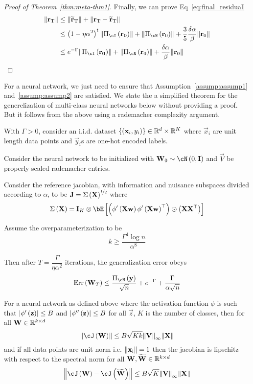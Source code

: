 \documentclass[a4paper]{article}
\begin{document}
\begin{proof}[Proof of Theorem~\ref{thm:meta-thm1}]
  Finally, we can prove Eq~\eqref{eq:final_residual}
  \begin{align*}
    \norm{\vec{r}_T}&\le \norm{\widetilde{\vec{r}}_T} + \norm{\vec{r}_T
                      - \widetilde{\vec{r}}_T}\\
                    &\le \br{1 -
        \eta\alpha^2}^t\norm{\Pi_\cI\br{\vec{r_0}} } +
      \norm{\Pi_\cN\br{\vec{r}_0}} +
                      \frac{3}{5}\frac{\delta\alpha}{\beta}\norm{\vec{r}_0}\\
                    &\le e^{-\Gamma}\norm{\Pi_\cI\br{\vec{r_0}} } +
      \norm{\Pi_\cN\br{\vec{r}_0}} +\frac{\delta\alpha}{\beta}\norm{\vec{r}_0}
  \end{align*}
\end{proof}

For a neural network, we just need to ensure that
Assumption~\eqref{assump:assump1} and~\eqref{assump:assump2} are
satisfied. We state the a simplified theorem for the generelization of
multi-class neural networks below without providing a proof. But it
follows from the above using a rademacher complexity argument.

\begin{thm}
  With $\Gamma>0$, consider an i.i.d. dataset
  $\left\{{\left({{\mathbf{x}}_i,y_i}\right)}\right\}\in\mathbb{R}^d\times\mathbb{R}^K$ where $\vec{x}_i$
  are unit length data points and $\vec{y}_i$s are one-hot encoded
  labels.

  Consider the neural network to be initialized with $\vec{W}_0\sim
  \cN\br{0,\vec{I}}$ and $\vec{V}$ be properly scaled rademacher
  entries.

  Consider the reference jacobian, with information and nuisance
  subspaces divided according to $\alpha$, to be
  ${\mathbf{J}}=\Sigma\left({{\mathbf{X}}}\right)^{\nicefrac{1}{2}}$
  where \[\Sigma\br{\vec{X}} =
    \vec{I}_K\otimes\bE\bs{\br{\phi^\prime\br{\vec{X}\vec{w}}\phi^\prime\br{\vec{X}\vec{w}}^\top}\odot\br{\vec{X}\vec{X}^\top}}\]

  Assume the overparameterization to be \[k\ge\dfrac{\Gamma^4\log
      n}{\alpha^8}\]

  Then after $T=\dfrac{\Gamma}{\eta\alpha^2}$ iterations, the
  generalization error obeys
  \[\mathrm{Err}\br{\vec{W}_T}\le
    \dfrac{\Pi_\cN\br{\vec{y}}}{\sqrt{n}} + e^{-\Gamma} +\dfrac{\Gamma}{\alpha\sqrt{n}}\]
\end{thm}
\begin{lem}
  For a neural network as defined above where the activation function
  $\phi$ is such that $\left| {\phi^\prime\left({{\mathbf{z}}}\right)} \right|\le B$ and
  $\left| {\phi^{\prime\prime}\left({{\mathbf{z}}}\right)} \right|\le B$ for all $\vec{z}$, $K$
  is the number of classes, then for all ${\mathbf{W}}\in\mathbb{R}^{k\times
    d}$\[\norm{\cJ\br{\vec{W}}}\le
    B\sqrt{Kk}\norm{\vec{V}}_\infty\norm{\vec{X}}\]
  and if all data points are unit norm i.e. $\mathrm{\left\lVert{\mathbf{x}}_i\right\rVert} = 1$
  then the jacobian is lipschitz with respect to the spectral norm for
  all ${\mathbf{W}},{\mathbf{\widetilde{{\mathbf{W}}}}}\in\mathbb{R}^{k\times d}$
  \[\norm{\cJ\br{\vec{W}} - \cJ\br{\widetilde{\vec{W}}}}\le B\sqrt{K}\norm{\vec{V}}_\infty\norm{\vec{X}}\]
\end{lem}
\end{document}
